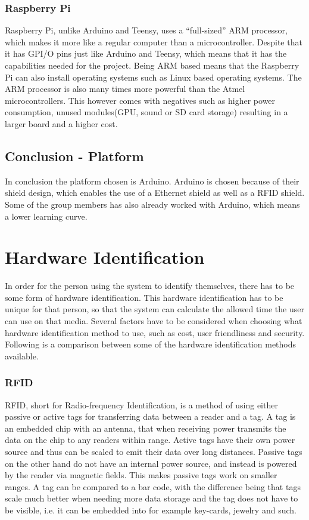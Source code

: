 \subsubsection{Raspberry Pi}
Raspberry Pi, unlike Arduino and Teensy, uses a ``full-sized'' ARM processor, which makes it more like a regular computer than a microcontroller. Despite that it has GPI/O pins just like Arduino and Teensy, which means that it has the capabilities needed for the project. Being ARM based means that the Raspberry Pi can also install operating systems such as Linux based operating systems. The ARM processor is also many times more powerful than the Atmel microcontrollers. This however comes with negatives such as higher power consumption, unused modules(GPU, sound or SD card storage) resulting in a larger board and a higher cost. \citep{raspberrypi}

\subsection{Conclusion - Platform}
In conclusion the platform chosen is Arduino. Arduino is chosen because of their shield design, which enables the use of a Ethernet shield as well as a RFID shield. Some of the group members has also already worked with Arduino, which means a lower learning curve.

\section{Hardware Identification}
In order for the person using the system to identify themselves, there has to be some form of hardware identification. This hardware identification has to be unique for that person, so that the system can calculate the allowed time the user can use on that media. Several factors have to be considered when choosing what hardware identification method to use, such as cost, user friendliness and security. Following is a comparison between some of the hardware identification methods available.

\subsubsection{RFID}
\label{rfidsect}
RFID, short for Radio-frequency Identification, is a method of using either passive or active tags for transferring data between a reader and a tag. A tag is an embedded chip with an antenna, that when receiving power transmits the data on the chip to any readers within range. Active tags have their own power source and thus can be scaled to emit their data over long distances. Passive tags on the other hand do not have an internal power source, and instead is powered by the reader via magnetic fields. This makes passive tags work on smaller ranges.\citep{rfidAndNfc} A tag can be compared to a bar code, with the difference being that tags scale much better when needing more data storage and the tag does not have to be visible, i.e. it can be embedded into for example key-cards, jewelry and such.

